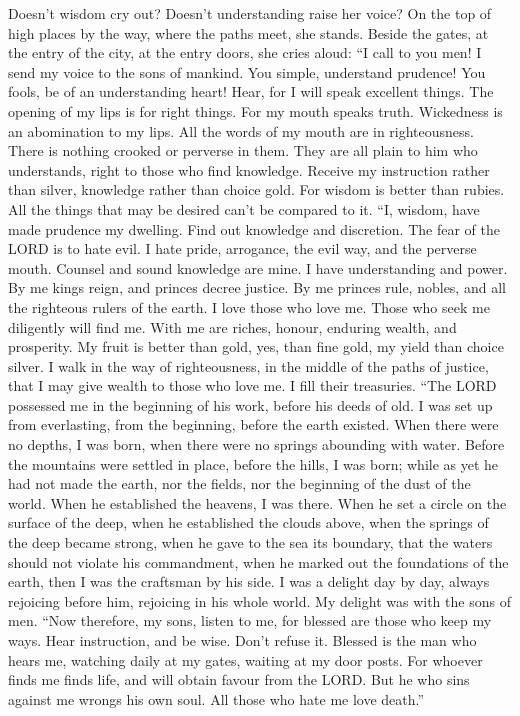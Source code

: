  Doesn't wisdom cry out? Doesn't understanding raise her
voice?  On the top of high places by the way, where the
paths meet, she stands.  Beside the gates, at the entry of
the city, at the entry doors, she cries aloud:  ``I call to
you men! I send my voice to the sons of mankind.  You
simple, understand prudence! You fools, be of an understanding heart!
 Hear, for I will speak excellent things. The opening of my
lips is for right things.  For my mouth speaks truth.
Wickedness is an abomination to my lips.  All the words of
my mouth are in righteousness. There is nothing crooked or perverse in
them.  They are all plain to him who understands, right to
those who find knowledge.  Receive my instruction rather
than silver, knowledge rather than choice gold.  For wisdom
is better than rubies. All the things that may be desired can't be
compared to it.  ``I, wisdom, have made prudence my
dwelling. Find out knowledge and discretion.  The fear of
the LORD is to hate evil. I hate pride, arrogance, the evil way, and the
perverse mouth.  Counsel and sound knowledge are mine. I
have understanding and power.  By me kings reign, and
princes decree justice.  By me princes rule, nobles, and
all the righteous rulers of the earth.  I love those who
love me. Those who seek me diligently will find me.  With
me are riches, honour, enduring wealth, and prosperity.  My
fruit is better than gold, yes, than fine gold, my yield than choice
silver.  I walk in the way of righteousness, in the middle
of the paths of justice,  that I may give wealth to those
who love me. I fill their treasuries.  ``The LORD possessed
me in the beginning of his work, before his deeds of old. 
I was set up from everlasting, from the beginning, before the earth
existed.  When there were no depths, I was born, when there
were no springs abounding with water.  Before the mountains
were settled in place, before the hills, I was born;  while
as yet he had not made the earth, nor the fields, nor the beginning of
the dust of the world.  When he established the heavens, I
was there. When he set a circle on the surface of the deep,
 when he established the clouds above, when the springs of
the deep became strong,  when he gave to the sea its
boundary, that the waters should not violate his commandment, when he
marked out the foundations of the earth,  then I was the
craftsman by his side. I was a delight day by day, always rejoicing
before him,  rejoicing in his whole world. My delight was
with the sons of men.  ``Now therefore, my sons, listen to
me, for blessed are those who keep my ways.  Hear
instruction, and be wise. Don't refuse it.  Blessed is the
man who hears me, watching daily at my gates, waiting at my door posts.
 For whoever finds me finds life, and will obtain favour
from the LORD.  But he who sins against me wrongs his own
soul. All those who hate me love death.''

